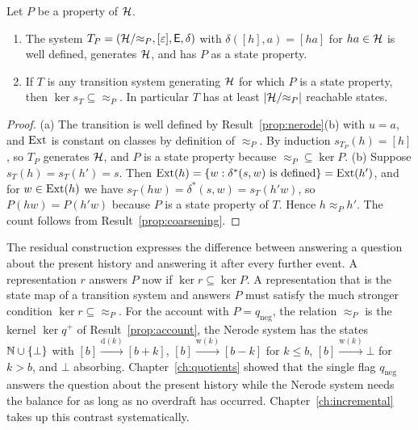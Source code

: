 \begin{established}\label{prop:nerode-system}
Let $P$ be a property of $\mathcal{H}$.
\begin{enumerate}[nosep,label=(\alph*)]
  \item The system $T_P=(\mathcal{H}/{\approx_P},[\varepsilon],\mathsf{E},\delta)$ with $\delta([h],a)=[ha]$ for $ha\in\mathcal{H}$ is well defined, generates $\mathcal{H}$, and has $P$ as a state property.
  \item If $T$ is any transition system generating $\mathcal{H}$ for which $P$ is a state property, then $\ker s_T\subseteq{\approx_P}$. In particular $T$ has at least $|\mathcal{H}/{\approx_P}|$ reachable states.
\end{enumerate}
\end{established}
\begin{proof}
(a) The transition is well defined by Result~\ref{prop:nerode}(b) with $u=a$, and $\operatorname{Ext}$ is constant on classes by definition of $\approx_P$. By induction $s_{T_P}(h)=[h]$, so $T_P$ generates $\mathcal{H}$, and $P$ is a state property because ${\approx_P}\subseteq\ker P$. (b) Suppose $s_T(h)=s_T(h')=s$. Then $\operatorname{Ext}(h)=\{w:\delta^{*}(s,w)\text{ is defined}\}=\operatorname{Ext}(h')$, and for $w\in\operatorname{Ext}(h)$ we have $s_T(hw)=\delta^{*}(s,w)=s_T(h'w)$, so $P(hw)=P(h'w)$ because $P$ is a state property of $T$. Hence $h\approx_P h'$. The count follows from Result~\ref{prop:coarsening}.
\end{proof}

The residual construction expresses the difference between answering a question about the present history and answering it after every further event. A representation $r$ answers $P$ now if $\ker r\subseteq\ker P$. A representation that is the state map of a transition system and answers $P$ must satisfy the much stronger condition $\ker r\subseteq{\approx_P}$. For the account with $P=q_{\mathrm{neg}}$, the relation $\approx_P$ is the kernel $\ker q^{+}$ of Result~\ref{prop:account}, the Nerode system has the states $\mathbb{N}\cup\{\bot\}$ with $[b]\xrightarrow{\mathrm{d}(k)}[b+k]$, $[b]\xrightarrow{\mathrm{w}(k)}[b-k]$ for $k\le b$, $[b]\xrightarrow{\mathrm{w}(k)}\bot$ for $k>b$, and $\bot$ absorbing. Chapter~\ref{ch:quotients} showed that the single flag $q_{\mathrm{neg}}$ answers the question about the present history while the Nerode system needs the balance for as long as no overdraft has occurred. Chapter~\ref{ch:incremental} takes up this contrast systematically.

